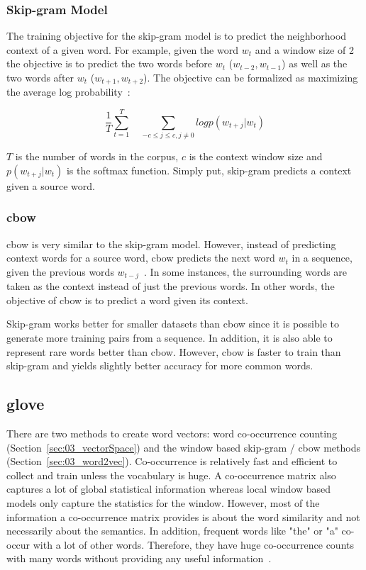 \subsubsection*{Skip-gram Model}

The training objective for the skip-gram model is to predict the neighborhood context of a given word. For example, given the word $w_t$ and a window size of 2 the objective is to predict the two words before $w_t$ {($w_{t-2}, w_{t-1}$)} as well as the two words after $w_t$ {($w_{t+1}, w_{t+2}$)}. The objective can be formalized as maximizing the average log probability~\cite{Mikolov2013e}:

\begin{equation}
\frac{1}{T} \sum_{t=1}^T \quad \sum_{-c\leq j \leq c, j \neq 0} log p(w_{t+j} | w_t)
\end{equation}

$T$ is the number of words in the corpus, $c$ is the context window size and $p(w_{t+j} | w_t)$ is the softmax function. Simply put, skip-gram predicts a context given a source word.

\subsubsection*{\acrfull{cbow}}

\gls{cbow} is very similar to the skip-gram model. However, instead of predicting context words for a source word, \gls{cbow} predicts the next word $w_{t}$ in a sequence, given the previous words $w_{t-j}$~\cite{Mikolov2013c}. In some instances, the surrounding words are taken as the context instead of just the previous words. In other words, the objective of \gls{cbow} is to predict a word given its context.
\medskip

Skip-gram works better for smaller datasets than \gls{cbow} since it is possible to generate more training pairs from a sequence. In addition, it is also able to represent rare words better than \gls{cbow}. However, \gls{cbow} is faster to train than skip-gram and yields slightly better accuracy for more common words.

\subsection{\acrfull{glove}}

There are two methods to create word vectors: word co-occurrence counting {(Section~\ref{sec:03_vectorSpace})} and the window based skip-gram / \gls{cbow} methods {(Section~\ref{sec:03_word2vec})}. Co-occurrence is relatively fast and efficient to collect and train unless the vocabulary is huge. A co-occurrence matrix also captures a lot of global statistical information whereas local window based models only capture the statistics for the window. However, most of the information a co-occurrence matrix provides is about the word similarity and not necessarily about the semantics. In addition, frequent words like "the" or "a" co-occur with a lot of other words. Therefore, they have huge co-occurrence counts with many words without providing any useful information~\cite{Pennington2014a}.

